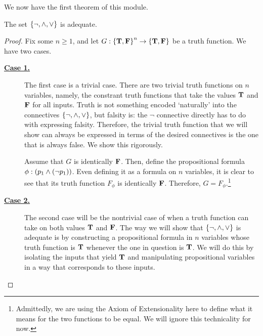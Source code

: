 We now have the first theorem of this module.

\begin{boxtheorem}\label{Ch1:Thm:DNFConnectivesAdequate}
    The set $\left\{ \neg, \land, \lor \right\}$ is adequate.
\end{boxtheorem}
\begin{proof}
    Fix some $n \geq 1$, and let $G : \left\{ \mathbf{T}, \mathbf{F} \right\}^n \to \left\{ \mathbf{T}, \mathbf{F} \right\}$ be a truth function. We have two cases.

    \begin{description}
        \item[\textbf{\underline{Case 1.}}] The first case is a trivial case. There are two trivial truth functions on $n$ variables, namely, the constrant truth functions that take the values $\mathbf{T}$ and $\mathbf{F}$ for all inputs. Truth is not something encoded `naturally' into the connectives $\left\{ \neg, \land, \lor \right\}$, but falsity is: the $\neg$ connective directly has to do with expressing falsity. Therefore, the trivial truth function that we will show can always be expressed in terms of the desired connectives is the one that is always false. We show this rigorously.
        
        Assume that $G$ is identically $\mathbf{F}$. Then, define the propositional formula $\phi : \left( p_1 \land \left( \neg p_1 \right) \right)$. Even defining it as a formula on $n$ variables, it is clear to see that its truth function $F_{\phi}$ is identically $\mathbf{F}$. Therefore, $G = F_{\phi}$.\footnote{Admittedly, we are using the Axiom of Extensionality here to define what it means for the two functions to be equal. We will ignore this technicality for now.}
        
        \item[\textbf{\underline{Case 2.}}] The second case will be the nontrivial case of when a truth function can take on both values $\mathbf{T}$ and $\mathbf{F}$. The way we will show that $\left\{ \neg, \land, \lor \right\}$ is adequate is by constructing a propositional formula in $n$ variables whose truth function is $\mathbf{T}$ whenever the one in question is $\mathbf{T}$. We will do this by isolating the inputs that yield $\mathbf{T}$ and manipulating propositional variables in a way that corresponds to these inputs.
        

\end{description}
\end{proof}

